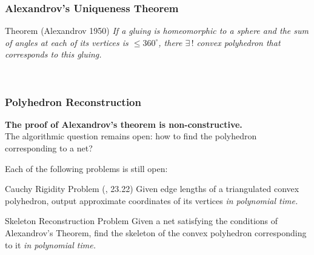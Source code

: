 \begin{frame}
\frametitle{Alexandrov's Uniqueness Theorem}

\vspace{3.8mm}

\begin{block}{Theorem ({\scriptsize Alexandrov 1950})}
	\itshape
	If a gluing is homeomorphic to a sphere and the sum of angles at each of its vertices is
	$\le 360^\circ$\!, there $\exists\,!$ convex polyhedron that corresponds to this gluing.
\end{block} \medskip

\begin{figure}
	\centering
	\begin{subfigure}[m]{0.46\textwidth}
		\centering
		
	\end{subfigure}
~
	\centering
	\begin{subfigure}[m]{0.46\textwidth}
		\centering
		
	\end{subfigure}
\end{figure}

\end{frame}


\begin{frame} \frametitle{Polyhedron Reconstruction}

\textcolor{hard}{\bf The proof of Alexandrov's theorem is non-constructive.} \smallskip \\
The algorithmic question remains open: how to find the polyhedron corresponding to a net?
\bigskip \\ \pause

Each of the following problems is still open: \medskip

\begin{block}{Cauchy Rigidity Problem ({\scriptsize {}, 23.22})} \small
	Given edge lengths of a triangulated convex polyhedron, output approximate coordinates of its vertices {\it in polynomial time.}
\end{block} \medskip \pause

\begin{block}{Skeleton Reconstruction Problem} \small
	Given a net satisfying the conditions of	Alexandrov's Theorem, find the skeleton of the convex polyhedron corresponding to it {\it in polynomial time.}
\end{block} \vspace{2.5mm}
\end{frame}

